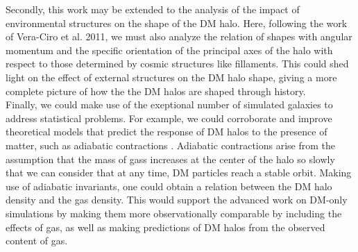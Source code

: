 Secondly, this work may be extended to the analysis of the impact of environmental structures on the shape of the DM halo. Here, following the work of Vera-Ciro et al. 2011, we must also analyze the relation of shapes with angular momentum and the specific orientation of the principal axes of the halo with respect to those determined by cosmic structures like fillaments. This could shed light on the effect of external structures on the DM halo shape, giving a more complete picture of how the the DM halos are shaped through history.\\


Finally, we could make use of the exeptional number of simulated galaxies to address statistical problems. For example, we could corroborate and improve theoretical models that predict the response of DM halos to the presence of matter, such as adiabatic contractions \cite{Gnedin_et_al._2004}. Adiabatic contractions arise from the assumption that the mass of gass increases at the center of the halo so slowly that we can consider that at any time, DM particles reach a stable orbit. Making use of adiabatic invariants, one could obtain a relation between the DM halo density and the gas density. This would support the advanced work on DM-only simulations by making them more observationally comparable by including the effects of gas, as well as making predictions of DM halos from the observed content of gas.\\




 
 
